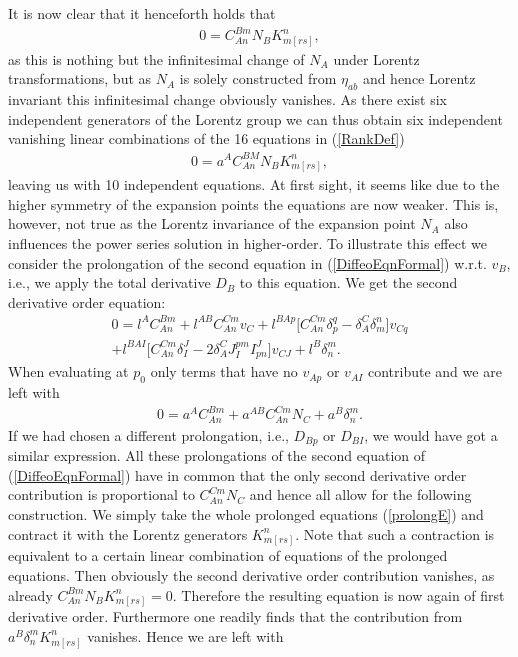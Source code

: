 \documentclass[a4paper,12pt, DIV=14, BCOR=5mm, twoside, headsepline, numbers=noenddot]{scrbook}
\begin{document}
It is now clear that it henceforth holds that
\begin{align}
    0 = C^{Bm}_{An}N_B K_{m[rs]}^n,
\end{align}
as this is nothing but the infinitesimal change of $N_A$ under Lorentz transformations, but as $N_A$ is solely constructed from $\eta_{ab}$ and hence Lorentz invariant this infinitesimal change obviously vanishes. As there exist six independent generators of the Lorentz group we can thus obtain six independent vanishing linear combinations of the 16 equations in (\ref{RankDef})
\begin{align}
    0 = a^A C^{BM}_{An}N_B K_{m[rs]}^n,
\end{align}
leaving us with 10 independent equations. At first sight, it seems like due to the higher symmetry of the expansion points the equations are now weaker. This is, however, not true as the Lorentz invariance of the expansion point $N_A$ also influences the power series solution in higher-order. To illustrate this effect we consider the prolongation of the second equation in (\ref{DiffeoEqnFormal}) w.r.t. $v_B$, i.e., we apply the total derivative $D_B$ to this equation. We get the second derivative order equation:
\begin{multline}
    0 = l^AC_{An}^{Bm} + l^{AB}C_{An}^{Cm}v_C + l^{BAp} \bigl[ C_{An}^{Cm} \delta_p^q - \delta_A^C \delta_m^n \bigr] v_{Cq}\\
    + l^{BAI} \bigl[ C_{An}^{Cm} \delta_I^J - 2 \delta_A^C J_I^{pm} I^J_{pn}  \bigr] v_{CJ} + l^{B} \delta^m_n.
\end{multline}
When evaluating at $p_0$ only terms that have no $v_{Ap}$ or $v_{AI}$ contribute and we are left with 
\begin{align}\label{prolongE}
    0 = a^A C_{An}^{Bm} + a^{AB} C_{An}^{Cm} N_C +  a^B \delta^m_n.
\end{align}
If we had chosen a different prolongation, i.e., $D_{Bp}$ or $D_{BI}$, we would have got a similar expression. All these prolongations of the second equation of (\ref{DiffeoEqnFormal}) have in common that the only second derivative order contribution is proportional to $C^{Cm}_{An} N_C$ and hence all allow for the following construction. We simply take the whole prolonged equations (\ref{prolongE}) and contract it with the Lorentz generators $K_{m[rs]}^n$. Note that such a contraction is equivalent to a certain linear combination of equations of the prolonged equations. Then obviously the second derivative order contribution vanishes, as already $C_{An}^{Bm} N_B K_{m[rs]}^n = 0$.  Therefore the resulting equation is now again of first derivative order. Furthermore one readily finds that the contribution from $a^B \delta^m_n K_{m[rs]}^n$ vanishes. Hence we are left with 
\end{document}
